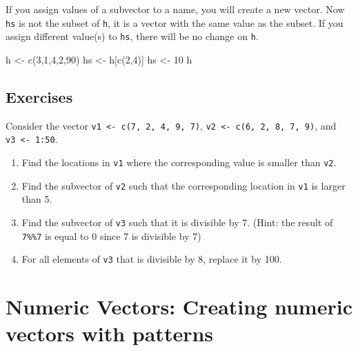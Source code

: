 \documentclass[
]{book}
\newenvironment{Shaded}{\begin{snugshade}}{\end{snugshade}}
\newcommand{\DecValTok}[1]{\textcolor[rgb]{0.00,0.00,0.81}{#1}}
\newcommand{\FunctionTok}[1]{\textcolor[rgb]{0.00,0.00,0.00}{#1}}
\newcommand{\NormalTok}[1]{#1}
\newcommand{\OtherTok}[1]{\textcolor[rgb]{0.56,0.35,0.01}{#1}}
\newenvironment{blackbox}{
  \definecolor{shadecolor}{rgb}{0, 0, 0}  %
  \color{white}
  \begin{shaded}}
 {\end{shaded}}
\newenvironment{infobox}[1]
  {
  \begin{itemize}
  \renewcommand{\labelitemi}{
    \raisebox{-.7\height}[0pt][0pt]{
      {\setkeys{Gin}{width=3em,keepaspectratio}
        \texttt{[image: pics/\#1]}}
    }
  }
  \setlength{\fboxsep}{1em}
  \begin{blackbox}
  \item
  }
  {
  \end{blackbox}
  \end{itemize}
  }
\begin{document}
\begin{infobox}{caution}

If you assign values of a subvector to a name, you will create a new vector. Now \texttt{hs} is not the subset of \texttt{h}, it is a vector with the same value as the subset. If you assign different value(s) to \texttt{hs}, there will be no change on \texttt{h}.

\begin{Shaded}
\begin{Highlighting}[]
\NormalTok{h }\OtherTok{\textless{}{-}} \FunctionTok{c}\NormalTok{(}\DecValTok{3}\NormalTok{,}\DecValTok{1}\NormalTok{,}\DecValTok{4}\NormalTok{,}\DecValTok{2}\NormalTok{,}\DecValTok{90}\NormalTok{)}
\NormalTok{hs }\OtherTok{\textless{}{-}}\NormalTok{ h[}\FunctionTok{c}\NormalTok{(}\DecValTok{2}\NormalTok{,}\DecValTok{4}\NormalTok{)]}
\NormalTok{hs }\OtherTok{\textless{}{-}} \DecValTok{10}
\NormalTok{h}
\end{Highlighting}
\end{Shaded}

\end{infobox}

\hypertarget{exercises-7}{%
\subsection{Exercises}\label{exercises-7}}

Consider the vector \texttt{v1\ \textless{}-\ c(7,\ 2,\ 4,\ 9,\ 7)}, \texttt{v2\ \textless{}-\ c(6,\ 2,\ 8,\ 7,\ 9)}, and \texttt{v3\ \textless{}-\ 1:50}.

\begin{enumerate}
\def\labelenumi{\arabic{enumi}.}
\item
  Find the locations in \texttt{v1} where the corresponding value is smaller than \texttt{v2}.
\item
  Find the subvector of \texttt{v2} such that the corresponding location in \texttt{v1} is larger than 5.
\item
  Find the subvector of \texttt{v3} such that it is divisible by 7. (Hint: the result of \texttt{7\%\%7} is equal to 0 since 7 is divisible by 7)
\item
  For all elements of \texttt{v3} that is divisible by 8, replace it by 100.
\end{enumerate}

\hypertarget{patterned_numeric_vectors_creation}{%
\section{Numeric Vectors: Creating numeric vectors with patterns}\label{patterned_numeric_vectors_creation}}
\end{document}
